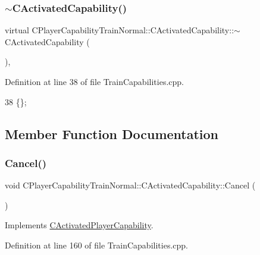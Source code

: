\subsubsection{\texorpdfstring{$\sim$\+C\+Activated\+Capability()}{~CActivatedCapability()}}
{\footnotesize\ttfamily virtual C\+Player\+Capability\+Train\+Normal\+::\+C\+Activated\+Capability\+::$\sim$\+C\+Activated\+Capability (\begin{DoxyParamCaption}{ }\end{DoxyParamCaption})\hspace{0.3cm}{\ttfamily [inline]}, {\ttfamily [virtual]}}



Definition at line 38 of file Train\+Capabilities.\+cpp.


\begin{DoxyCode}
38 \{\};
\end{DoxyCode}


\subsection{Member Function Documentation}
\hypertarget{classCPlayerCapabilityTrainNormal_1_1CActivatedCapability_a028dc1f8c528cc726737d712f0236884}{}\label{classCPlayerCapabilityTrainNormal_1_1CActivatedCapability_a028dc1f8c528cc726737d712f0236884} 
\subsubsection{\texorpdfstring{Cancel()}{Cancel()}}
{\footnotesize\ttfamily void C\+Player\+Capability\+Train\+Normal\+::\+C\+Activated\+Capability\+::\+Cancel (\begin{DoxyParamCaption}{ }\end{DoxyParamCaption})\hspace{0.3cm}{\ttfamily [virtual]}}



Implements \hyperlink{classCActivatedPlayerCapability_a5cde83be468e262ad054d81e28684a81}{C\+Activated\+Player\+Capability}.



Definition at line 160 of file Train\+Capabilities.\+cpp.


